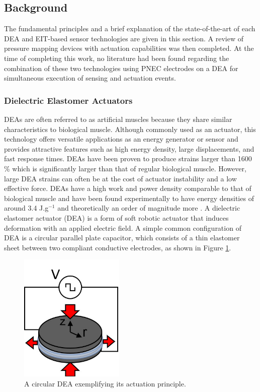 \subsection{Background} 
\label{subsec:background}
The fundamental principles and a brief explanation of the state-of-the-art of each DEA and EIT-based sensor technologies are given in this section. A review of pressure mapping devices with actuation capabilities was then completed. At the time of completing this work, no literature had been found regarding the combination of these two technologies using PNEC electrodes on a DEA for simultaneous execution of sensing and actuation events.  

\subsubsection{Dielectric Elastomer Actuators}
\label{subsubsec:deas}
DEAs are often referred to as artificial muscles because they share similar characteristics to biological muscle. Although commonly used as an actuator, this technology offers versatile applications as an energy generator\cite{McKnight2002, Carpi2008, Koh2009} or sensor and provides attractive features such as high energy density, large displacements, and fast response times. DEAs have been proven to produce strains larger than 1600 \%\cite{Keplinger2012} which is significantly larger than that of regular biological muscle. However, large DEA strains can often be at the cost of actuator instability and a low effective force. DEAs have a high work and power density comparable to that of biological muscle and have been found experimentally to have energy densities of around 3.4 J.g$^{-1}$ and theoretically an order of magnitude more\cite{Liu2009, Koh2009} . A dielectric elastomer actuator (DEA) is a form of soft robotic actuator that induces deformation with an applied electric field. A simple common configuration of DEA is a circular parallel plate capacitor, which consists of a thin elastomer sheet between two compliant conductive electrodes, as shown in Figure \ref{fig:DEA_diagram}. 
\begin{figure}[H]
	\centering
	\includegraphics[width=5cm]{Figures/circ_DEA_v2.jpg} %
	\vspace{0.2cm}
	\caption{A circular DEA exemplifying its actuation principle.}
	\label{fig:DEA_diagram}
\end{figure}
